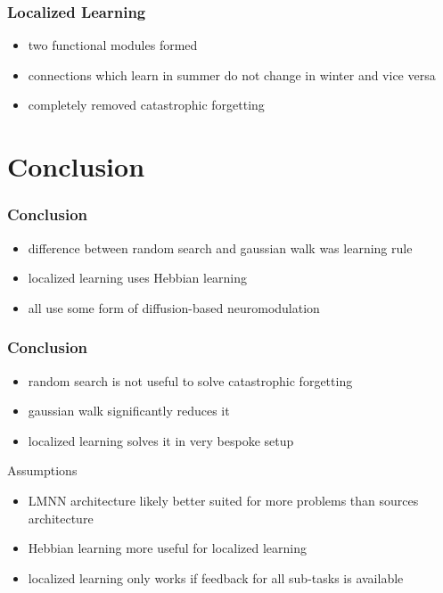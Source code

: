 \documentclass[14pt]{beamer}
\theoremstyle{remark}
\begin{document}
\begin{frame}[t]
    \frametitle{Localized Learning}
    \begin{itemize}
        \item two functional modules formed
        \vfill
        \item connections which learn in summer do not change in winter and vice
              versa
        \vfill
        \item completely removed catastrophic forgetting
	\end{itemize}
\end{frame}

\section{Conclusion}

\begin{frame}[t]
    \frametitle{Conclusion}
    \begin{itemize}
        \item difference between random search and gaussian walk was learning rule
        \vfill
        \item localized learning uses Hebbian learning
        \vfill
        \item all use some form of diffusion-based neuromodulation
	\end{itemize}
\end{frame}

\begin{frame}[t]
    \frametitle{Conclusion}

    \begin{itemize}
        \item random search is not useful to solve catastrophic forgetting
        \vfill
        \item gaussian walk significantly reduces it
        \vfill
        \item localized learning solves it in very bespoke setup
	\end{itemize}

    Assumptions
    \begin{itemize}
        \item LMNN architecture likely better suited for more problems than
              sources architecture
        \vfill
        \item Hebbian learning more useful for localized learning
        \vfill
        \item localized learning only works if feedback for all sub-tasks is
              available
    \end{itemize}
\end{frame}
\end{document}
